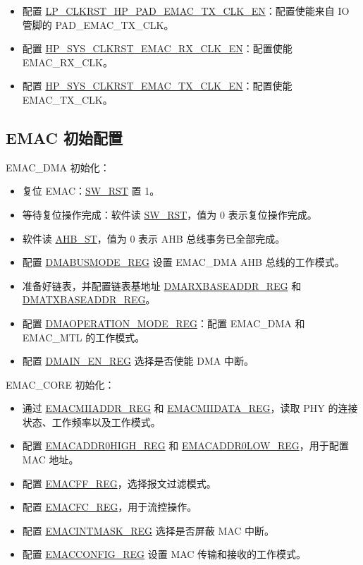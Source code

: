 \documentclass[main\_\_CN.tex]{subfiles}
\begin{document}
\begin{enumerate}
\begin{itemize}
\begin{itemize}
        \item 配置 \hyperref[fielddesc:LPCLKRSTHPPADEMACTXCLKEN]{LP\_CLKRST\_HP\_PAD\_EMAC\_TX\_CLK\_EN}：配置使能来自 IO 管脚的 PAD\_EMAC\_TX\_CLK。
        \item 配置 \hyperref[regdesc:HPSYSCLKRSTSOCCLKCTRL1REG]{HP\_SYS\_CLKRST\_EMAC\_RX\_CLK\_EN}：配置使能 EMAC\_RX\_CLK。
        \item 配置 \hyperref[regdesc:HPSYSCLKRSTPERICLKCTRL01REG]{HP\_SYS\_CLKRST\_EMAC\_TX\_CLK\_EN}：配置使能 EMAC\_TX\_CLK。
    \end{itemize}
\end{itemize}
\end{enumerate}



\subsection{EMAC 初始配置}

EMAC\_DMA 初始化：
\begin{itemize}
\item 复位 EMAC：\hyperref[regdesc:DMABUSMODEREG]{SW\_RST} 置 1。
\item 等待复位操作完成：软件读 \hyperref[regdesc:DMABUSMODEREG]{SW\_RST}，值为 0 表示复位操作完成。
\item 软件读 \hyperref[regdesc:DMAHBSTATUSREG]{AHB\_ST}，值为 0 表示 AHB 总线事务已全部完成。
\item 配置 \hyperref[regdesc:DMABUSMODEREG]{DMABUSMODE\_REG} 设置 EMAC\_DMA AHB 总线的工作模式。
\item 准备好链表，并配置链表基地址 \hyperref[regdesc:DMARXBASEADDRREG]{DMARXBASEADDR\_REG} 和 \hyperref[regdesc:DMATXBASEADDRREG]{DMATXBASEADDR\_REG}。
\item 配置 \hyperref[regdesc:DMAOPERATIONMODEREG]{DMAOPERATION\_MODE\_REG}：配置 EMAC\_DMA 和 EMAC\_MTL 的工作模式。
\item 配置 \hyperref[regdesc:DMAINENREG]{DMAIN\_EN\_REG} 选择是否使能 DMA 中断。
\end{itemize}

EMAC\_CORE 初始化：
\begin{itemize}
\item 通过 \hyperref[regdesc:EMACMIIADDRREG]{EMACMIIADDR\_REG} 和 \hyperref[regdesc:EMACMIIDATAREG]{EMACMIIDATA\_REG}，读取 PHY 的连接状态、工作频率以及工作模式。
\item 配置 \hyperref[regdesc:EMACADDR0HIGHREG]{EMACADDR0HIGH\_REG} 和 \hyperref[regdesc:EMACADDR0LOWREG]{EMACADDR0LOW\_REG}，用于配置 MAC 地址。
\item 配置 \hyperref[regdesc:EMACFFREG]{EMACFF\_REG}，选择报文过滤模式。
\item 配置 \hyperref[regdesc:EMACFLOWCONTROLREG]{EMACFC\_REG}，用于流控操作。
\item 配置 \hyperref[regdesc:EMACINTMASKREG]{EMACINTMASK\_REG} 选择是否屏蔽 MAC 中断。
\item 配置 \hyperref[regdesc:EMACCONFIGREG]{EMACCONFIG\_REG} 设置 MAC 传输和接收的工作模式。
\end{itemize}
\end{document}
